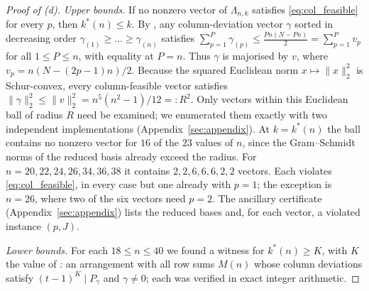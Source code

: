 \begin{proof}[Proof of (d)]
\emph{Upper bounds.}  If no nonzero vector of $\Lambda_{n,k}$ satisfies \eqref{eq:col_feasible} for every $p$, then $k^*(n)\le k$.
By , any column-deviation vector $\gamma$ sorted in decreasing order $\gamma_{(1)}\ge\dots\ge\gamma_{(n)}$ satisfies $\sum_{p=1}^P\gamma_{(p)}\le \frac{Pn(N-Pn)}{2}=\sum_{p=1}^P v_p$ for all $1\le P\le n$, with equality at $P=n$. Thus $\gamma$ is majorised by $v$, where $v_p=n(N-(2p-1)n)/2$. Because the squared Euclidean norm $x\mapsto\|x\|_2^2$ is Schur-convex, every column-feasible vector satisfies $\|\gamma\|_2^2\le\|v\|_2^2=n^5(n^2-1)/12=:R^2$. Only vectors within this Euclidean ball of radius $R$ need be examined; we enumerated them exactly with two independent implementations (Appendix~\ref{sec:appendix}).
At $k=k^*(n)$ the ball contains no nonzero vector for $16$ of the $23$ values of $n$, since the Gram--Schmidt norms of the reduced basis already exceed the radius.
For $n=20,22,24,26,34,36,38$ it contains $2,2,6,6,6,2,2$ vectors.
Each violates \eqref{eq:col_feasible}, in every case but one already with $p=1$; the exception is $n=26$, where two of the six vectors need $p=2$.
The ancillary certificate (Appendix~\ref{sec:appendix}) lists the reduced bases and, for each vector, a violated instance $(p,J)$.

\emph{Lower bounds.}  For each $18\le n\le40$ we found a witness for $k^*(n)\ge K$, with $K$ the value of : an arrangement with all row sums $M(n)$ whose column deviations satisfy $(t-1)^{K}\mid P_\gamma$ and $\gamma\ne0$; each was verified in exact integer arithmetic.
\end{proof}

